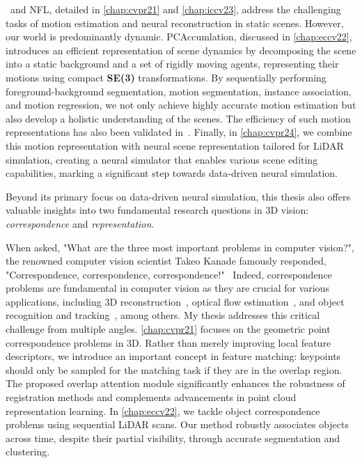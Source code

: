 \acro~and NFL, detailed in \cref{chap:cvpr21} and \cref{chap:iccv23},  address the challenging tasks of motion estimation and neural reconstruction in static scenes. However, our world is predominantly dynamic. PCAccumlation, discussed in \cref{chap:eccv22}, introduces an efficient representation of scene dynamics by decomposing the scene into a static background and a set of rigidly moving agents, representing their motions using compact \textbf{SE(3)} transformations. By sequentially performing foreground-background segmentation, motion segmentation, instance association, and motion regression, we not only achieve highly accurate motion estimation but also develop a holistic understanding of the scenes. The efficiency of such motion representations has also been validated in~\cite{seidenschwarz2024semoli,vidanapathirana2024multi}. Finally, in \cref{chap:cvpr24}, we combine this motion representation with neural scene representation tailored for LiDAR simulation, creating a neural simulator that enables various scene editing capabilities, marking a significant step towards data-driven neural simulation.

Beyond its primary focus on data-driven neural simulation, this thesis also offers valuable insights into two fundamental research questions in 3D vision: \textit{correspondence} and \textit{representation}.

When asked, "What are the three most important problems in computer vision?", the renowned computer vision scientist Takeo Kanade famously responded, "Correspondence, correspondence, correspondence!"~\cite{Wang-2019-117586} Indeed, correspondence problems are fundamental in computer vision as they are crucial for various applications, including 3D reconstruction~\cite{schoenberger2016mvs,schoenberger2016sfm}, optical flow estimation~\cite{dosovitskiy2015flownet,sun2018pwc}, and object recognition and tracking~\cite{tang2023emergent}, among others. My thesis addresses this critical challenge from multiple angles. \cref{chap:cvpr21} focuses on the geometric point correspondence problems in 3D. Rather than merely improving local feature descriptors, we introduce an important concept in feature matching: keypoints should only be sampled for the matching task if they are in the overlap region. The proposed overlap attention module significantly enhances the robustness of registration methods and complements advancements in point cloud representation learning. In \cref{chap:eccv22}, we tackle object correspondence problems using sequential LiDAR scans. Our method robustly associates objects across time, despite their partial visibility, through accurate segmentation and clustering. 

